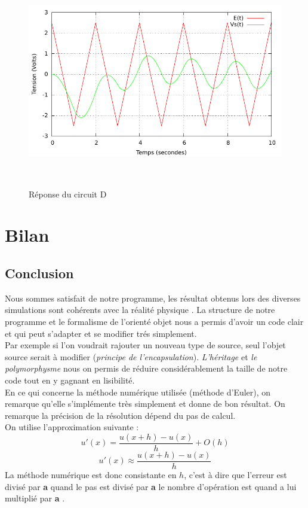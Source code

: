 \documentclass[a4paper,11pt]{article}
\begin{document}
\begin{figure}[h!]
\begin{minipage}[b]{0.5\linewidth}
   \end{minipage}
  \begin{minipage}[b]{0.5\linewidth}   
      \centering \includegraphics[scale=.68]{CDtriangle.pdf}
   \end{minipage}\\
 \caption{Réponse du circuit D}
\end{figure}

\newpage
 \section{Bilan}
\subsection{Conclusion}
Nous sommes satisfait de notre programme, les résultat obtenus lors des diverses simulations sont cohérents avec la réalité physique .
La structure de notre programme et le formalisme de l'orienté objet nous a permis d'avoir un code clair et qui peut s'adapter et se modifier trés simplement.\\
Par exemple si l'on voudrait rajouter un nouveau type de source, seul l'objet source serait à modifier (\emph{principe de l'encapsulation}). \emph{L'héritage} et \emph{le polymorphysme}
nous on permis de réduire considérablement la taille de notre code tout en y gagnant en lisibilité.\\

En ce qui concerne la méthode numérique utilisée (méthode d'Euler), on remarque qu'elle s'implémente très simplement et donne de bon résultat. On remarque 
la précision de la résolution dépend du pas de calcul.\\
On utilise l'approximation suivante  :
\begin{equation*}
u'(x)=\frac{u(x+h)-u(x)}{h}+O(h)
\end{equation*}
\begin{equation*}
u'(x)\approx\frac{u(x+h)-u(x)}{h}
\end{equation*}
La méthode numérique est donc consistante en $h$, c'est à dire que l'erreur est divisé par \textbf{a} quand le pas est divisé par \textbf{a} le nombre d'opération est quand a lui multiplié par \textbf{a} .
\end{document}
